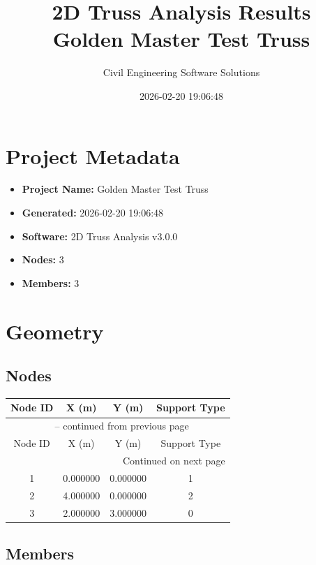 \documentclass[11pt,a4paper]{article}
\title{2D Truss Analysis Results\\Golden Master Test Truss}
\author{Civil Engineering Software Solutions}
\date{2026-02-20 19:06:48}
\begin{document}
\maketitle

\section{Project Metadata}

\begin{itemize}
  \item \textbf{Project Name:} Golden Master Test Truss
  \item \textbf{Generated:} 2026-02-20 19:06:48
  \item \textbf{Software:} 2D Truss Analysis v3.0.0
  \item \textbf{Nodes:} 3
  \item \textbf{Members:} 3
\end{itemize}

\section{Geometry}

\subsection{Nodes}

\begin{longtable}{cccc}
\toprule
Node ID & X (m) & Y (m) & Support Type \\
\midrule
\endfirsthead

\multicolumn{4}{c}{{\tablename\ \thetable{} -- continued from previous page}} \\
\toprule
Node ID & X (m) & Y (m) & Support Type \\
\midrule
\endhead

\midrule
\multicolumn{4}{r}{{Continued on next page}} \\
\endfoot

\bottomrule
\endlastfoot

1 & 0.000000 & 0.000000 & 1 \\
2 & 4.000000 & 0.000000 & 2 \\
3 & 2.000000 & 3.000000 & 0 \\
\end{longtable}

\subsection{Members}
\end{document}
